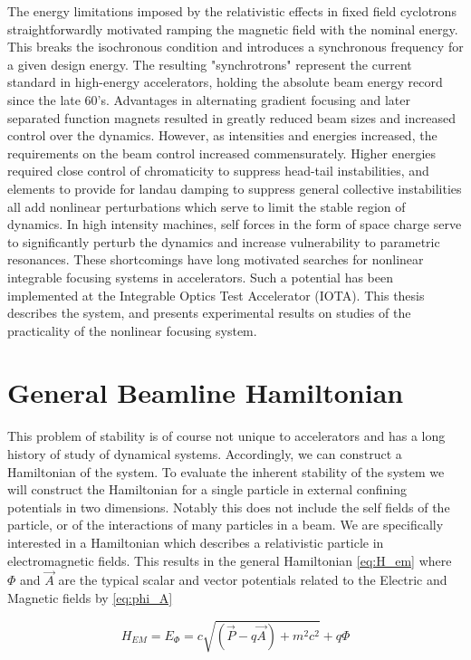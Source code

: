 The energy limitations imposed by the relativistic effects in fixed field cyclotrons straightforwardly motivated ramping the magnetic field with the nominal energy. This breaks the isochronous condition and introduces a synchronous frequency for a given design energy. The resulting "synchrotrons" represent the current standard in high-energy accelerators, holding the absolute beam energy record since the late 60's. Advantages in alternating gradient focusing and later separated function magnets resulted in greatly reduced beam sizes and increased control over the dynamics. However, as intensities and energies increased, the requirements on the beam control increased commensurately. Higher energies required close control of chromaticity to suppress head-tail instabilities, and elements to provide for landau damping to suppress general collective instabilities all add nonlinear perturbations which serve to limit the stable region of dynamics. In high intensity machines, self forces in the form of space charge serve to significantly perturb the dynamics and increase vulnerability to parametric resonances. These shortcomings have long motivated searches for nonlinear integrable focusing systems in accelerators. Such a potential has been implemented at the Integrable Optics Test Accelerator (IOTA). This thesis describes the system, and presents experimental results on studies of the practicality of the nonlinear focusing system.

\section{General Beamline Hamiltonian} \label{sec:genHam}

This problem of stability is of course not unique to accelerators and has a long history of study of dynamical systems. Accordingly, we can construct a Hamiltonian of the system. To evaluate the inherent stability of the system we will construct the Hamiltonian for a single particle in external confining potentials in two dimensions. Notably this does not include the self fields of the particle, or of the interactions of many particles in a beam. We are specifically interested in a Hamiltonian which describes a relativistic particle in electromagnetic fields. This results in the general Hamiltonian \ref{eq:H_em} where $\Phi$ and $\vec{A}$ are the typical scalar and vector potentials related to the Electric and Magnetic fields by \ref{eq:phi_A}

\begin{equation} \label{eq:H_em}
H_{EM} = E_{\Phi} = c\sqrt{(\vec{P} - q\vec{A}) + m^2 c^2} + q\Phi
\end{equation}

